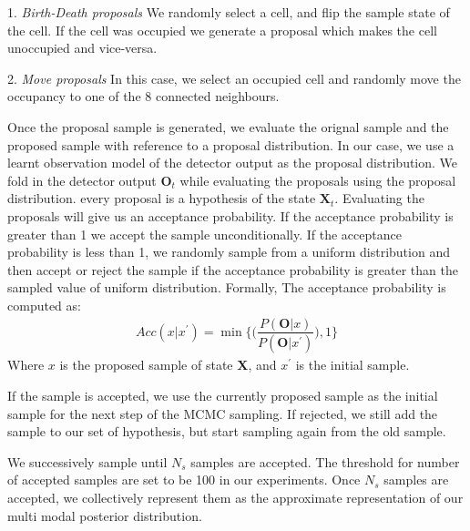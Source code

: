 1. \textit{Birth-Death proposals}
We randomly select a cell, and flip the sample state of the cell. If the cell was occupied we generate a proposal which makes the cell unoccupied and vice-versa.

2. \textit{Move proposals}
In this case, we select an occupied cell and randomly move the occupancy to one of the 8 connected neighbours.

Once the proposal sample is generated, we evaluate the orignal sample and the proposed sample with reference to a proposal distribution. In our case, we use a learnt observation model of the detector output as the proposal distribution. We fold in the detector output $\textbf{O}_{t}$ while evaluating the proposals using the proposal distribution. every proposal is a hypothesis of the state $\textbf{X}_{t}$.
Evaluating the proposals will give us an acceptance probability. If the acceptance probability is greater than 1 we accept the sample unconditionally. If the acceptance probability is less than 1, we randomly sample from a uniform distribution and then accept or reject the sample if the acceptance probability is greater than the sampled value of uniform distribution. Formally,
The acceptance probability is computed as:
\begin{align}
Acc(x|x^{'}) = \min\Big\lbrace\Big(\dfrac{P(\textbf{O}|x)}{P(\textbf{O}|x^{'})}\Big),1\Big\rbrace
\end{align}
Where $x$ is the proposed sample of state \textbf{X}, and $x^{'}$ is the initial sample.

If the sample is accepted, we use the currently proposed sample as the initial sample for the next step of the MCMC sampling. If rejected, we still add the sample to our set of hypothesis, but start sampling again from the old sample.

We successively sample until $N_{s}$ samples are accepted. The threshold for number of accepted samples are set to be 100 in our experiments. Once $N_{s}$ samples are accepted, we collectively represent them as the approximate representation of our multi modal posterior distribution.